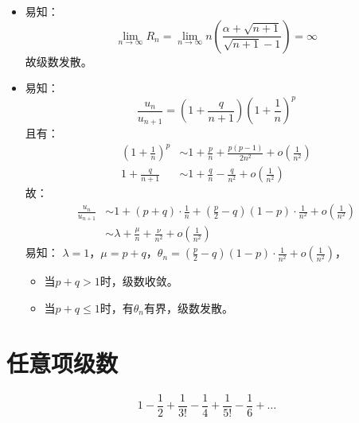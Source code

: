 \begin{solution}
    \begin{itemize}
        \item 易知： \[
                \lim_{n \to \infty} R_{n}=\lim_{n \to \infty} n\left(
                    \frac{\alpha+\sqrt{n+1}}{\sqrt{n+1}-1}
                \right)= \infty
            \]
            故级数发散。
        \item 易知： \[
                \frac{u_{n}}{u_{n+1}}= \left(
                1+\frac{q}{n+1} \right)\left(
                1+\frac{1}{n} \right)^{p}
            \]
            且有：
            \begin{align}
                \left( 1+\frac{1}{n} \right)^{p} & \sim 1+
                \frac{p}{n}+
                \frac{p(p-1)}{2n^{2}} + o(\frac{1}{n^{2}})
                \\
                1 + \frac{q}{n+1}                & \sim
                1+\frac{q}{n}-\frac{q}{n^{2}}+o(\frac{1}{n^{2}})
            \end{align}
            故：
            \begin{align*}
                \frac{u_{n}}{u_{n+1}} & \sim  1+(p+q)\cdot
                \frac{1}{n}+\left(
                \frac{p}{2}-q \right)\left( 1-p\right) \cdot
                \frac{1}{n^{2}}+o(\frac{1}{n^{2}})
                \\
                & \sim \lambda + \frac{\mu}{n} + \frac{\nu}{n^{2}} +
                o(\frac{1}{n^{2}})
            \end{align*}
            易知： \(\lambda = 1\)，\(\mu = p+q\)，\(\theta_{n} =
                \left(\frac{p}{2}-q
                \right)\left(
            1-p\right)\cdot\frac{1}{n^{2}}+o(\frac{1}{n^{2}})\)，

            \begin{itemize}
                \item 当\(p+q > 1\)时，级数收敛。
                \item 当\(p+q \le 1\)时，有\(\theta_n\)有界，级数发散。
            \end{itemize}
    \end{itemize}

\end{solution}
\section{任意项级数}
\[
    1 - \frac{1}{2} + \frac{1}{3!} - \frac{1}{4} + \frac{1}{5!} -
    \frac{1}{6} + \dots
\]

